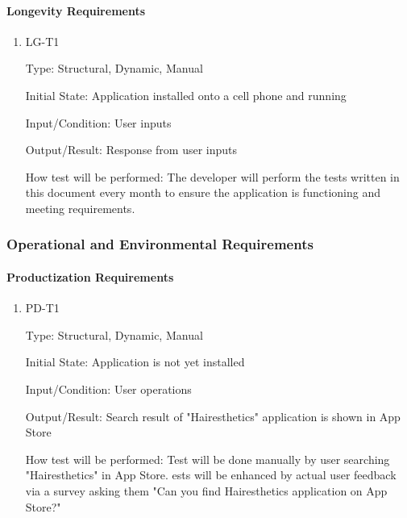\documentclass[12pt, titlepage]{article}
\begin{document}
\paragraph{Longevity Requirements}

\begin{enumerate}

\item{LG-T1\\}

Type: Structural, Dynamic, Manual
					
Initial State: Application installed onto a cell phone and running
					
Input/Condition: User inputs
					
Output/Result: Response from user inputs
					
How test will be performed: The developer will perform the tests written in this document every month to ensure the application is functioning and meeting requirements.

\end{enumerate}

\subsubsection{Operational and Environmental Requirements}
		
\paragraph{Productization Requirements}

\begin{enumerate}

\item{PD-T1\\}

Type: Structural, Dynamic, Manual
					
Initial State: Application is not yet installed
					
Input/Condition: User operations
					
Output/Result: Search result of "Hairesthetics" application is shown in App Store
					
How test will be performed: Test will be done manually by user searching "Hairesthetics" in App Store. ests will be enhanced by actual user feedback via a survey asking them "Can you find Hairesthetics application on App Store?"

\end{enumerate}
\end{document}
